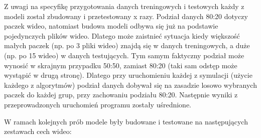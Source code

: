 Z uwagi na specyfikę przygotowania danych treningowych i testowych każdy z modeli został zbudowany i przetestowany x razy. Podział danych 80:20 dotyczy paczek wideo, natomiast budowa modeli odbywa się już na podstawie pojedynczych plików wideo. Dlatego może zaistnieć sytuacja kiedy większość małych paczek (np. po 3 pliki wideo) znajdą się w danych treningowych, a duże (np. po 15 wideo) w danych testujących. Tym samym faktyczny podział może wynosić w skrajnym przypadku 50:50, zamiast 80:20 (taki sam odstęp może wystąpić w drugą stronę). Dlatego przy uruchomieniu każdej z symulacji (użycie każdego z algorytmów) podział danych dobywał się na zasadzie losowo wybranych paczek do każdej grup, przy zachowaniu podziału 80:20. Następnie wyniki z przeprowadzonych uruchomień programu zostały uśrednione.\par
W ramach kolejnych prób modele były budowane i testowane na następujących zestawach cech wideo:
